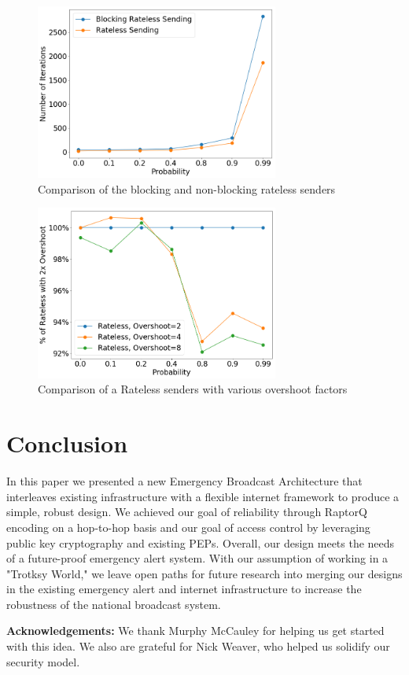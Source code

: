 \begin{figure}[tp]
\centering
\noindent
\includegraphics[width=8cm]{figures/big_font/BLOCKING_RATELESS_BETTER.png}
\caption{Comparison of the blocking and non-blocking rateless senders}
\label{graph:blockingvsnot}
\end{figure}

\begin{figure}[tp]
\centering
\noindent
\includegraphics[width=8cm]{figures/FACTOR_VARY_FOCUS.png}
\caption{Comparison of a Rateless senders with various overshoot factors}
\label{graph:varyParams}
\end{figure}

\section{Conclusion}
In this paper we presented a new Emergency Broadcast Architecture that interleaves existing infrastructure with a flexible internet framework to produce a simple, robust design. We achieved our goal of reliability through RaptorQ encoding on a hop-to-hop basis and our goal of access control by leveraging  public key cryptography and existing PEPs. Overall, our design meets the needs of a future-proof emergency alert system. With our assumption of working in a "Trotksy World," we leave open paths for future research into merging our designs in the existing emergency alert and internet infrastructure to increase the robustness of the national broadcast system.

\textbf{Acknowledgements:} We thank Murphy McCauley for helping us get started with this idea. We also are grateful for Nick Weaver, who helped us solidify our security model.

